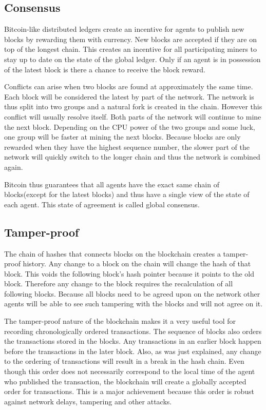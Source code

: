 \subsection{Consensus}
Bitcoin-like distributed ledgers create an incentive for agents to publish new blocks by rewarding 
them with currency. New blocks are accepted if they are on top of the longest chain. This creates 
an incentive for all participating miners to stay up to date on the state of the global ledger. Only
if an agent is in possession of the latest block is there a chance to receive the block reward. 

Conflicts can arise when two blocks are found at approximately the same time. Each block will be 
considered the latest by part of the network. The network is thus split into two groups and a natural
fork is created in the chain. However this conflict will usually resolve itself. Both parts of the 
network will continue to mine the next block. Depending on the CPU power of the two groups and some
luck, one group will be faster at mining the next blocks. Because blocks are only rewarded when they
have the highest sequence number, the slower part of the network will quickly switch to the longer
chain and thus the network is combined again. 

Bitcoin thus guarantees that all agents have the exact same chain of blocks(except for the latest 
blocks) and thus have a single view of the state of each agent. This state of agreement is called
global consensus.

\subsection{Tamper-proof}
The chain of hashes that connects blocks on the blockchain creates a tamper-proof history. Any 
change to a block on the chain will change the hash of that block. This voids the following block's
hash pointer because it points to the old block. Therefore any change to the block requires the 
recalculation of all following blocks. Because all blocks need to be agreed upon on the network 
other agents will be able to see such tampering with the blocks and will not agree on it. 

The tamper-proof nature of the blockchain makes it a very useful tool for recording chronologically 
ordered transactions. The sequence of blocks also orders the transactions stored in the blocks. Any
transactions in an earlier block happen before the transactions in the later block. Also, as was just 
explained, any change to the ordering of transactions will result in a break in the hash chain. Even though this order
does not necessarily correspond to the local time of the agent who published the transaction, the 
blockchain will create a globally accepted order for transactions.  This is a major 
achievement because this order is robust against network delays, tampering and other attacks.

